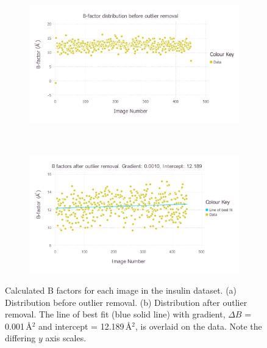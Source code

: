 \begin{figure}
    \centering
    \begin{subfigure}[b]{1.0\textwidth}
            \centering
            \includegraphics[width=\textwidth]{figures/datared/BFac_Plot_Before_outlier_removal.pdf}
            \caption{}
            \label{fig:B factors per image before outlier removal - insulin}
    \end{subfigure}
    \\
    \begin{subfigure}[b]{1.0\textwidth}
            \centering
            \includegraphics[width=\textwidth]{figures/datared/BFac_Plot_After_outlier_removal.pdf}
            \caption{}
            \label{fig:B factors per image after outlier removal - insulin}
    \end{subfigure}
    \caption[Calculated B factors for each image in the insulin dataset.]{Calculated B factors for each image in the insulin dataset.
    (a) Distribution before outlier removal.
    (b) Distribution after outlier removal.
    The line of best fit (blue solid line) with gradient, $\Delta B$ = 0.001$\,$\AA$^{\text{2}}$ and intercept = 12.189$\,$\AA$^{\text{2}}$, is overlaid on the data.
    Note the differing $y$ axis scales.}
    \label{fig:B factors per image - insulin}
\end{figure}

